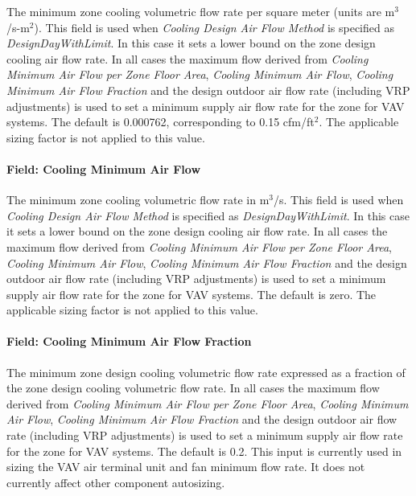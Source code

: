 The minimum zone cooling volumetric flow rate per square meter (units are m\(^{3}\)/s-m\(^{2}\)). This field is used when \emph{Cooling Design Air Flow Method} is specified as \emph{DesignDayWithLimit}. In this case it sets a lower bound on the zone design cooling air flow rate. In all cases the maximum flow derived from \emph{Cooling Minimum Air Flow per Zone Floor Area}, \emph{Cooling Minimum Air Flow}, \emph{Cooling Minimum Air Flow Fraction} and the design outdoor air flow rate (including VRP adjustments) is used to set a minimum supply air flow rate for the zone for VAV systems. The default is 0.000762, corresponding to 0.15 cfm/ft\(^{2}\). The applicable sizing factor is not applied to this value.

\paragraph{Field: Cooling Minimum Air Flow}\label{field-cooling-minimum-air-flow}

The minimum zone cooling volumetric flow rate in m\(^{3}\)/s. This field is used when \emph{Cooling Design Air Flow Method} is specified as \emph{DesignDayWithLimit}. In this case it sets a lower bound on the zone design cooling air flow rate.  In all cases the maximum flow derived from \emph{Cooling Minimum Air Flow per Zone Floor Area}, \emph{Cooling Minimum Air Flow}, \emph{Cooling Minimum Air Flow Fraction} and the design outdoor air flow rate (including VRP adjustments) is used to set a minimum supply air flow rate for the zone for VAV systems. The default is zero. The applicable sizing factor is not applied to this value.

\paragraph{Field: Cooling Minimum Air Flow Fraction}\label{field-cooling-minimum-air-flow-fraction}

The minimum zone design cooling volumetric flow rate expressed as a fraction of the zone design cooling volumetric flow rate.  In all cases the maximum flow derived from \emph{Cooling Minimum Air Flow per Zone Floor Area}, \emph{Cooling Minimum Air Flow}, \emph{Cooling Minimum Air Flow Fraction} and the design outdoor air flow rate (including VRP adjustments) is used to set a minimum supply air flow rate for the zone for VAV systems. The default is 0.2. This input is currently used in sizing the VAV air terminal unit and fan minimum flow rate. It does not currently affect other component autosizing.

